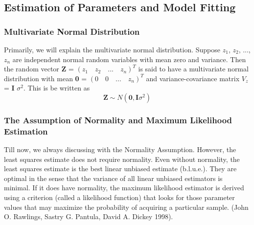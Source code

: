 \documentclass[a4paper]{article}
\begin{document}
\subsection{Estimation of Parameters and Model Fitting}





\subsubsection{Multivariate Normal Distribution}
Primarily,  we will explain the multivariate normal distribution. Suppose $z_1$, $z_2$, ..., $z_n$ are independent normal random variables with mean zero and variance. Then the random vector \textbf{Z} = $(z_1 \quad z_2 \quad ... \quad z_n)^T$ is said to have a multivariate normal distribution with mean \textbf{0} =  $(0 \quad 0  \quad... \quad z_n)^T$ and variance-covariance matrix \textbf{$V_z$} = \textbf{I} $\sigma^2$. This is be written as \[\textbf{Z} \sim N(\textbf{0},\textbf{I} \sigma^2)\]


\subsubsection{The Assumption of Normality and Maximum Likelihood Estimation}
Till now, we always discussing with the Normality Assumption. However, the least squares estimate does not require normality. Even without normality, the least squares estimate is the best linear unbiased estimate (b.l.u.e.). They are optimal in the sense that the variance of all linear unbiased estimators is minimal. If it does have normality, the maximum likelihood estimator is derived using a criterion (called a likelihood function) that looks for those parameter values that may maximize the probability of acquiring a particular sample. (John O. Rawlings, Sastry G. Pantula, David A. Dickey 1998). \\
\end{document}
